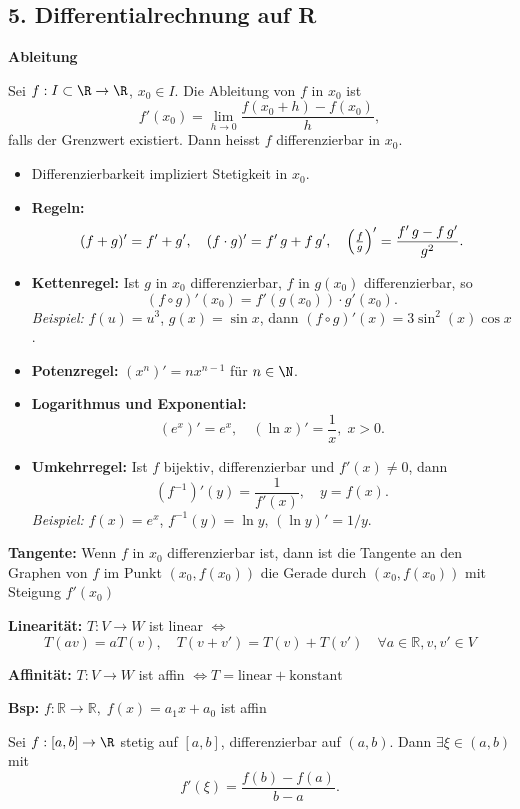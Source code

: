 \subsection{5. Differentialrechnung auf R}
\textbf{Ableitung}
\begin{definition}
  Sei $f:I\subset\R\to\R$, $x_0\in I$. Die Ableitung von $f$ in $x_0$ ist
  \[
    f'(x_0) = \lim_{h\to0} \frac{f(x_0 + h) - f(x_0)}{h},
  \]
  falls der Grenzwert existiert. Dann heisst $f$ differenzierbar in $x_0$.
\end{definition}
\begin{itemize}
  \item Differenzierbarkeit impliziert Stetigkeit in $x_0$.
  \item \textbf{Regeln:}
    \[
      (f+g)' = f' + g', \quad 
      (f\cdot g)' = f'\,g + f\,g', \quad
      \Bigl(\tfrac{f}{g}\Bigr)' = \frac{f'\,g - f\,g'}{g^2}.
    \]
  \item \textbf{Kettenregel:} Ist $g$ in $x_0$ differenzierbar, $f$ in $g(x_0)$ differenzierbar, so
    \[
      (f\circ g)'(x_0) = f'(g(x_0)) \cdot g'(x_0).
    \]
    \emph{Beispiel:} $f(u)=u^3$, $g(x)=\sin x$, dann $(f\circ g)'(x)=3\sin^2(x)\cos x$.
  \item \textbf{Potenzregel:} $(x^n)' = n x^{n-1}$ für $n\in\N$.
  \item \textbf{Logarithmus und Exponential:}  
    \[
      (e^x)' = e^x,\quad (\ln x)' = \frac{1}{x},\; x>0.
    \]
  \item \textbf{Umkehrregel:} Ist $f$ bijektiv, differenzierbar und $f'(x)\ne0$, dann
    \[
      (f^{-1})'(y) = \frac{1}{f'(x)},\quad y = f(x).
    \]
    \emph{Beispiel:} $f(x)=e^x$, $f^{-1}(y)=\ln y$, $(\ln y)' = 1/y$.
\end{itemize}

\textbf{Tangente:}  
Wenn \(f\) in \(x_0\) differenzierbar ist, dann ist die Tangente an den Graphen von \(f\) im Punkt \((x_0, f(x_0))\)  
die Gerade durch \((x_0, f(x_0))\) mit Steigung \(f'(x_0)\)

\textbf{Linearität:}  
\(T: V \to W\) ist linear \(\Leftrightarrow\)  
\[
T(av) = aT(v), \quad T(v + v') = T(v) + T(v')\quad \forall a \in \mathbb{R}, v, v' \in V
\]

\textbf{Affinität:}  
\(T: V \to W\) ist affin \(\Leftrightarrow T = \text{linear} + \text{konstant}\)

\textbf{Bsp:} \(f: \mathbb{R} \to \mathbb{R},\; f(x) = a_1 x + a_0\) ist affin

\begin{theorem}
  Sei $f:[a,b]\to\R$ stetig auf $[a,b]$, differenzierbar auf $(a,b)$. Dann $\exists\xi\in(a,b)$ mit
  \[
    f'(\xi) = \frac{f(b)-f(a)}{b-a}.
  \]
\end{theorem}

